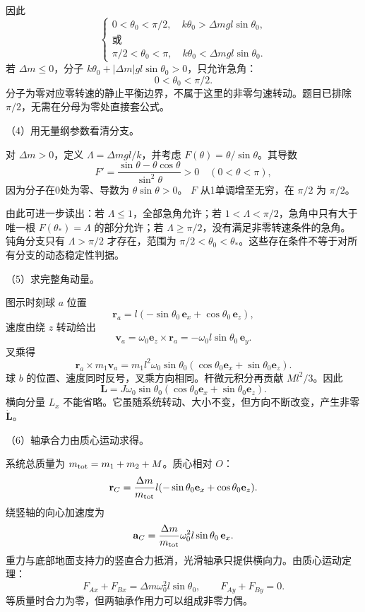 \documentclass[12pt,a4paper,fontset=fandol]{ctexart}
\begin{document}
因此 \[
\boxed{
\begin{cases}
0<\theta_0<\pi/2,\quad
k\theta_0>\Delta mgl\sin\theta_0,\\
\text{或}\\
\pi/2<\theta_0<\pi,\quad
k\theta_0<\Delta mgl\sin\theta_0.
\end{cases}}\tag{6.3}
\] 若 \(\Delta m\le0\)，分子
\(k\theta_0+|\Delta m|gl\sin\theta_0>0\)，只允许急角： \[
\boxed{0<\theta_0<\pi/2.}\tag{6.4}
\]
分子为零对应零转速的静止平衡边界，不属于这里的非零匀速转动。题目已排除
\(\pi/2\)，无需在分母为零处直接套公式。

（4）用无量纲参数看清分支。

对 \(\Delta m>0\)，定义 \(\Lambda=\Delta mgl/k\)，并考虑
\(F(\theta)=\theta/\sin\theta\)。其导数 \[
F'=\frac{\sin\theta-\theta\cos\theta}{\sin^2\theta}>0
\quad(0<\theta<\pi),
\] 因为分子在0处为零、导数为 \(\theta\sin\theta>0\)。 \(F\)
从1单调增至无穷，在 \(\pi/2\) 为 \(\pi/2\)。

由此可进一步读出：若 \(\Lambda\le1\)，全部急角允许；若
\(1<\Lambda<\pi/2\)，急角中只有大于唯一根 \(F(\theta_*)=\Lambda\)
的部分允许；若 \(\Lambda\ge\pi/2\)，没有满足非零转速条件的急角。
钝角分支只有 \(\Lambda>\pi/2\) 才存在，范围为
\(\pi/2<\theta_0<\theta_*\)。这些存在条件不等于对所有分支的动态稳定性判据。

（5）求完整角动量。

图示时刻球 \(a\) 位置 \[
\mathbf r_a=l(-\sin\theta_0\,\mathbf e_x+
\cos\theta_0\,\mathbf e_z),
\] 速度由绕 \(z\) 转动给出 \[
\mathbf v_a=\omega_0\mathbf e_z\times\mathbf r_a
=-\omega_0l\sin\theta_0\,\mathbf e_y.
\] 叉乘得 \[
\mathbf r_a\times m_1\mathbf v_a
=m_1l^2\omega_0\sin\theta_0
(\cos\theta_0\mathbf e_x+\sin\theta_0\mathbf e_z).
\] 球 \(b\) 的位置、速度同时反号，叉乘方向相同。杆微元积分再贡献
\(Ml^2/3\)。因此 \[
\boxed{
\mathbf L=J\omega_0\sin\theta_0
(\cos\theta_0\mathbf e_x+\sin\theta_0\mathbf e_z).}\tag{6.5}
\] 横向分量 \(L_x\)
不能省略。它虽随系统转动、大小不变，但方向不断改变，产生非零
\(\dot{\mathbf L}\)。

（6）轴承合力由质心运动求得。

系统总质量为 \(m_{\rm tot}=m_1+m_2+M\)。质心相对 \(O\)： \[
\mathbf r_C=\frac{\Delta m}{m_{\rm tot}}
l(-\sin\theta_0\mathbf e_x+\cos\theta_0\mathbf e_z).
\] 绕竖轴的向心加速度为 \[
\mathbf a_C=
\frac{\Delta m}{m_{\rm tot}}\omega_0^2l\sin\theta_0\,\mathbf e_x.
\]
重力与底部地面支持力的竖直合力抵消，光滑轴承只提供横向力。由质心运动定理：
\[
F_{Ax}+F_{Bx}=\Delta m\omega_0^2l\sin\theta_0,
\qquad F_{Ay}+F_{By}=0.\tag{6.6}
\] 等质量时合力为零，但两轴承作用力可以组成非零力偶。
\end{document}
